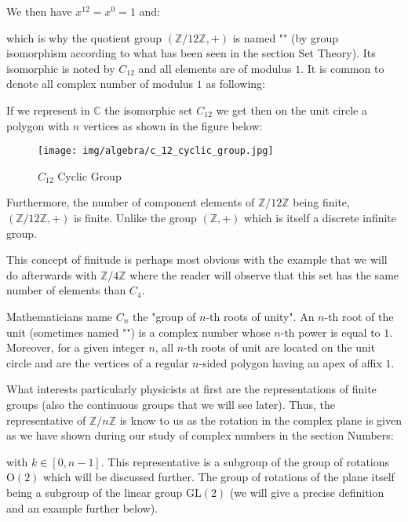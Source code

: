\begin{enumerate}
		We then have $x^{12}=x^0=1$ and:
		
		which is why the quotient group $(\mathbb{Z}/12\mathbb{Z},+)$ is named "" (by group isomorphism according to what has been seen in the section Set Theory). Its isomorphic is noted by $C_{12}$ and all elements are of modulus $1$. It is common to denote all complex number of modulus $1$ as following:
		
		If we represent in $\mathbb{C}$ the isomorphic set $C_{12}$ we get then on the unit circle a polygon with $n$ vertices as shown in the figure below:
		\begin{figure}[H]
			\centering
			\texttt{[image: img/algebra/c\_12\_cyclic\_group.jpg]}
			\caption{$C_{12}$ Cyclic Group}
		\end{figure}
		Furthermore, the number of component elements of $\mathbb{Z}/12\mathbb{Z}$ being finite, $(\mathbb{Z}/12\mathbb{Z},+)$ is finite. Unlike the group $(\mathbb{Z},+)$ which is itself a discrete infinite group.
		
		This concept of finitude is perhaps most obvious with the example that we will do afterwards with $\mathbb{Z}/4\mathbb{Z}$ where the reader will observe that this set has the same number of elements than $C_4$.	
	\end{enumerate}
	
	\begin{tcolorbox}[title=Remark,colframe=black,arc=10pt]
	Mathematicians name $C_n$ the "group of $n$-th roots of unity". An $n$-th root of the unit (sometimes named "") is a complex number whose $n$-th power is equal to $1$. Moreover, for a given integer $n$, all $n$-th roots of unit are located on the unit circle and are the vertices of a regular $n$-sided polygon having an apex of affix $1$.
	\end{tcolorbox}
	What interests particularly physicists at first are the representations of finite groups (also the continuous groups that we will see later). Thus, the representative of $\mathbb{Z}/n\mathbb{Z}$ is know to us as the rotation in the complex plane is given as we have shown during our study of complex numbers in the section Numbers:
	
	with $k\in[0,n-1]$. This representative is a subgroup of the group of rotations $\text{O}(2)$ which will be discussed further. The group of rotations of the plane itself being a subgroup of the linear group $\text{GL}(2)$ (we will give a precise definition and an example further below).
	
